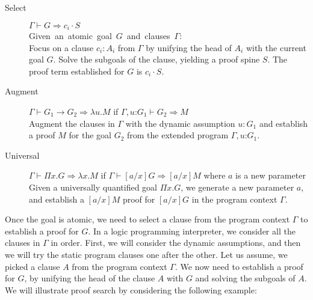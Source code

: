 \documentclass{llncs}
\newcommand{\figfoot}{\vspace{1ex}\hrule}
\newcommand{\fighead}{\hrule\vspace{1.5ex}}
\newcommand{\vd}{\vdash}
\newcommand{\arrow}{\rightarrow}
\newcommand{\oftp}{\mathord{:}}
\begin{document}
\begin{small}
\begin{description}
\item[Select] $\Gamma \vd  G \Rightarrow c_i \cdot S$ \\
    \mbox{Given an atomic goal $G$ and clauses $\Gamma$:}\hfill\\
     Focus on a clause $c_i : A_i$ from $\Gamma$ by unifying the 
     head of $A_i$ with the current goal $G$. 
     Solve the subgoals of the clause, yielding a proof spine $S$.
     The proof term established for $G$ is $c_i\cdot S$.

\item[Augment] $\Gamma \vd  G_1 \arrow G_2 \Rightarrow \lambda u. M$ if $\Gamma,
  u\oftp G_1 \vd G_2 \Rightarrow M$ \\
Augment the clauses in $\Gamma$ with the dynamic assumption $u{:} G_1$ and
establish a proof $M$ for the goal $G_2$ from the extended program
$\Gamma, u \oftp G_1$. 
\item[Universal] $\Gamma \vd  \Pi x. G \Rightarrow \lambda x. M$ if $\Gamma \vd
  [a/x]G\Rightarrow [a/x]M$ where $a$ is a new parameter\\
Given a universally quantified goal $\Pi x. G$, we generate a new parameter $a$, and establish a $[a/x]M$ proof  for $[a/x]G$ in the program context $\Gamma$.
\end{description}
\end{small}    


Once the goal is atomic, we need to select a clause from the
program context $\Gamma$ to establish a proof for $G$. In a logic
programming interpreter, we consider all the clauses in $\Gamma$ in order. 
First, we will consider the dynamic assumptions, and then we will try
the static program clauses one after the other. 
Let us assume, we picked a clause $A$ from the program context
$\Gamma$. We now need to establish a proof for $G$, by unifying the
head of the clause $A$ with $G$ and solving the subgoals of $A$.
We will illustrate proof search by considering the following example:  
\end{document}
